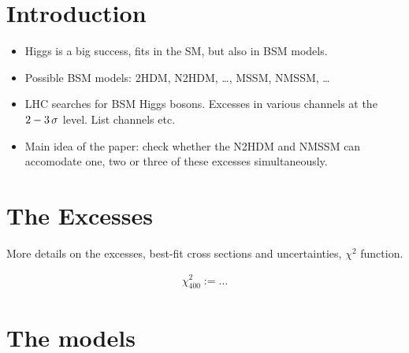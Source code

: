 \documentclass[12pt]{article}
\begin{document}

\def\thefootnote{\arabic{footnote}}
\setcounter{page}{0}
\setcounter{footnote}{0}

\newpage




\section{Introduction}
\label{sec:intro}


\begin{itemize}

\item
Higgs is a big success, fits in the SM, but also in BSM models.

\item
Possible BSM models: 2HDM, N2HDM, \ldots, MSSM, NMSSM, \ldots

\item
LHC searches for BSM Higgs bosons. Excesses in various channels at the
$2-3\,\sigma$ level. List channels etc.

\item
Main idea of the paper: check whether the N2HDM and NMSSM can accomodate
one, two or three of these excesses simultaneously.


\end{itemize}



\section{The Excesses}
\label{sec:excesses}

\noindent
More details on the excesses, best-fit cross sections and uncertainties,
$\chi^2$ function.

\begin{align}
\chi^2_{400} := \ldots
\label{chi400}
\end{align}


\section{The models}
\label{sec:models}
\end{document}
